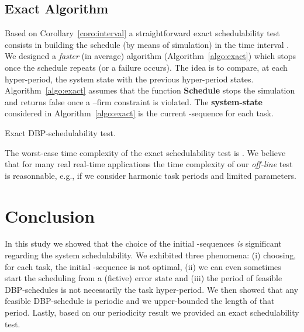 \documentclass{article}
\begin{document}
\subsection{Exact Algorithm}

Based on Corollary~\ref{coro:interval} a straightforward exact schedulability test consists in building the schedule (by means of simulation) in the time interval . We designed a \emph{faster} (in average) algorithm (Algorithm~\ref{algo:exact}) which stops once the schedule repeats (or a failure occurs). The idea is to compare, at each hyper-period, the system state with the previous hyper-period states. Algorithm~\ref{algo:exact} assumes that the function \textbf{Schedule} stops the simulation and returns false once a --firm constraint is violated. The \textbf{system-state} considered in Algorithm~\ref{algo:exact} is the current -sequence for each task.

\begin{algorithm}
\tcc{}
\caption{Exact DBP-schedulability test.\label{algo:exact}}
\end{algorithm}

The worst-case time complexity of the exact schedulability test is . We believe that for many real real-time applications the time complexity of our \emph{off-line} test is reasonnable, e.g., if we consider harmonic task periods and limited  parameters.

\section{Conclusion}\label{sec:conclusion}
In this study we showed that the choice of the initial -sequences \emph{is} significant regarding the system schedulability. We exhibited three phenomena: (i) choosing, for each task, the initial -sequence  is not optimal, (ii) we can even sometimes start the scheduling from a (fictive) error state and (iii) the period of feasible DBP-schedules is not necessarily the task hyper-period. We then showed that any feasible DBP-schedule is periodic and we upper-bounded the length of that period. Lastly, based on our periodicity result we provided an exact schedulability test. 
\end{document}
